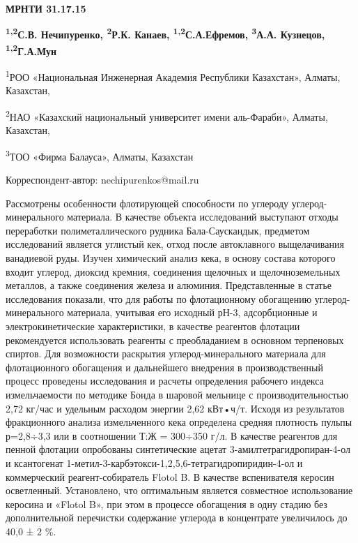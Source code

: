 \newpage
{\bfseries МРНТИ 31.17.15}


\begin{center}
{\bfseries \textsuperscript{1,2}С.В. Нечипуренко, \textsuperscript{2}Р.К. Канаев, \textsuperscript{1,2}С.А.Ефремов, \textsuperscript{3}А.А. Кузнецов, \textsuperscript{1,2}Г.А.Мун}

\textsuperscript{1}РОО «Национальная Инженерная Академия Республики
Казахстан», Алматы, Казахстан,

\textsuperscript{2}НАО «Казахский национальный университет имени
аль-Фараби», Алматы, Казахстан,

\textsuperscript{3}ТОО «Фирма Балауса», Алматы, Казахстан

Корреспондент-автор: nechipurenkos@mail.ru
\end{center}

Рассмотрены особенности флотирующей способности по углероду
углерод-минерального материала. В качестве объекта исследований
выступают отходы переработки полиметаллического рудника Бала-Саускандык,
предметом исследований является углистый кек, отход после автоклавного
выщелачивания ванадиевой руды. Изучен химический анализ кека, в основу
состава которого входит углерод, диоксид кремния, соединения щелочных и
щелочноземельных металлов, а также соединения железа и алюминия.
Представленные в статье исследования показали, что для работы по
флотационному обогащению углерод-минерального материала, учитывая его
исходный рН-3, адсорбционные и электрокинетические характеристики, в
качестве реагентов флотации рекомендуется использовать реагенты с
преобладанием в основном терпеновых спиртов. Для возможности раскрытия
углерод-минерального материала для флотационного обогащения и
дальнейшего внедрения в производственный процесс проведены исследования
и расчеты определения рабочего индекса измельчаемости по методике Бонда
в шаровой мельнице с производительностью 2,72 кг/час и удельным расходом
энергии 2,62 кВт•ч/т. Исходя из результатов фракционного анализа
измельченного кека определена средняя плотность пульпы р=2,8÷3,3 или в
соотношении Т:Ж = 300÷350 г/л. В качестве реагентов для пенной флотации
опробованы синтетические ацетат 3-амилтетрагидропиран-4-ол и ксантогенат
1-метил-3-карбэтокси-1,2,5,6-тетрагидропиридин-4-ол и коммерческий
реагент-собиратель Flotol B. В качестве вспенивателя керосин
осветленный. Установлено, что оптимальным является совместное
использование керосина и «Flotol B», при этом в процессе обогащения в
одну стадию без дополнительной перечистки содержание углерода в
концентрате увеличилось до 40,0 ± 2 \%.

